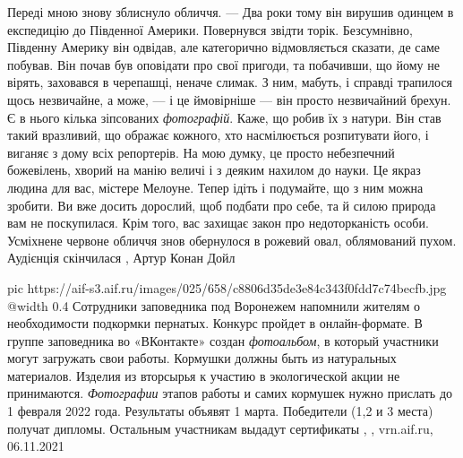 Переді мною знову зблиснуло обличчя. — Два роки тому він вирушив одинцем в
експедицію до Південної Америки.  Повернувся звідти торік. Безсумнівно,
Південну Америку він одвідав, але категорично відмовляється сказати, де саме
побував. Він почав був оповідати про свої пригоди, та побачивши, що йому не
вірять, заховався в черепашці, неначе слимак. З ним, мабуть, і справді
трапилося щось незвичайне, а може, — і це ймовірніше — він просто незвичайний
брехун. Є в нього кілька зіпсованих \emph{фотографій}. Каже, що робив їх з
натури. Він став такий вразливий, що ображає кожного, хто насмілюється
розпитувати його, і виганяє з дому всіх репортерів.  На мою думку, це просто
небезпечний божевілень, хворий на манію величі і з деяким нахилом до науки. Це
якраз людина для вас, містере Мелоуне. Тепер ідіть і подумайте, що з ним можна
зробити. Ви вже досить дорослий, щоб подбати про себе, та й силою природа вам
не поскупилася. Крім того, вас захищає закон про недоторканість особи.
Усміхнене червоне обличчя знов обернулося в рожевий овал, облямований пухом.
Аудієнція скінчилася
, Артур Конан Дойл

\ifcmt
  pic https://aif-s3.aif.ru/images/025/658/c8806d35de3e84c343f0fdd7c74becfb.jpg
  @width 0.4
\fi
Сотрудники заповедника под Воронежем напомнили жителям о необходимости
подкормки пернатых. Конкурс пройдет в онлайн-формате. В группе заповедника во
«ВКонтакте» создан \emph{фотоальбом}, в который участники могут загружать свои работы.
Кормушки должны быть из натуральных материалов. Изделия из вторсырья к участию
в экологической акции не принимаются.
\emph{Фотографии} этапов работы и самих кормушек нужно прислать до 1 февраля 2022
года. Результаты объявят 1 марта.  Победители (1,2 и 3 места) получат дипломы.
Остальным участникам выдадут сертификаты
, 
, vrn.aif.ru, 06.11.2021
